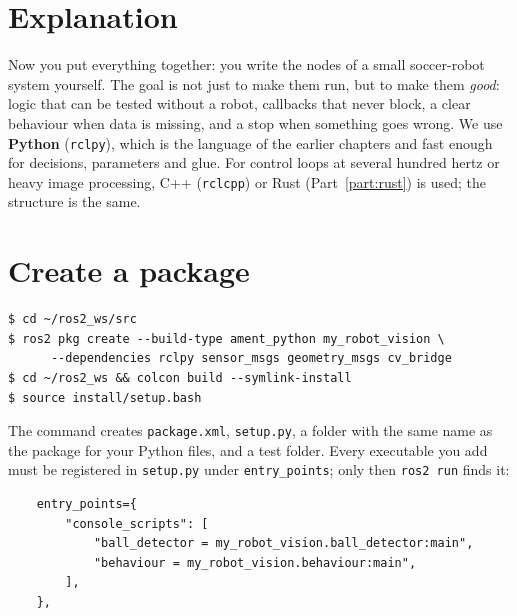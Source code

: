 \label{ch:ros6}

\section*{Explanation}
Now you put everything together: you write the nodes of a small soccer-robot system yourself. The goal is not just to make them run, but to make them \emph{good}: logic that can be tested without a robot, callbacks that never block, a clear behaviour when data is missing, and a stop when something goes wrong. We use \textbf{Python} (\verb!rclpy!), which is the language of the earlier chapters and fast enough for decisions, parameters and glue. For control loops at several hundred hertz or heavy image processing, C++ (\verb!rclcpp!) or Rust (Part~\ref{part:rust}) is used; the structure is the same.

\section*{Create a package}
\begin{verbatim}
$ cd ~/ros2_ws/src
$ ros2 pkg create --build-type ament_python my_robot_vision \
      --dependencies rclpy sensor_msgs geometry_msgs cv_bridge
$ cd ~/ros2_ws && colcon build --symlink-install
$ source install/setup.bash
\end{verbatim}
The command creates \verb!package.xml!, \verb!setup.py!, a folder with the same name as the package for your Python files, and a test folder. Every executable you add must be registered in \verb!setup.py! under \verb!entry_points!; only then \verb!ros2 run! finds it:
\begin{verbatim}
    entry_points={
        "console_scripts": [
            "ball_detector = my_robot_vision.ball_detector:main",
            "behaviour = my_robot_vision.behaviour:main",
        ],
    },
\end{verbatim}

